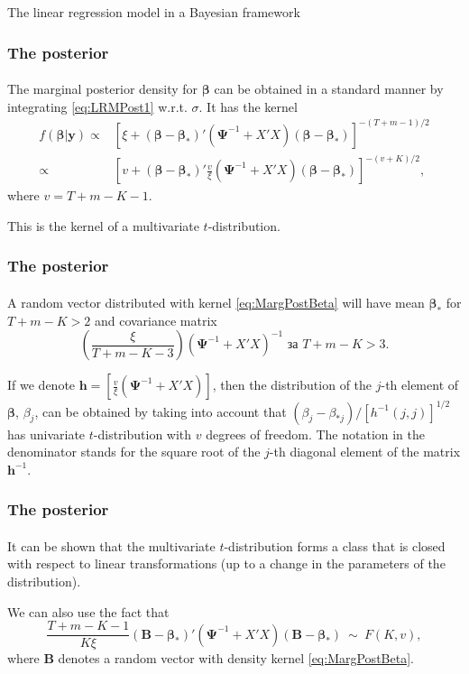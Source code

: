 \documentclass[10pt]{beamer}
\theoremstyle{definition}
\begin{document}
\begin{section}{The linear regression model in a Bayesian framework}
\begin{frame}[fragile]
\frametitle{The posterior}
\framesubtitle{}
The marginal posterior density for $\boldsymbol{\beta}$ can be obtained in a standard manner by integrating \eqref{eq:LRMPost1} w.r.t.
$\sigma$. It has the kernel \begin{equation}
\label{eq:MargPostBeta}\begin{split} f(\boldsymbol{\beta}|\mathbf{y})\propto
& \left[ \xi +
(\boldsymbol{\beta}-\boldsymbol{\beta_*})'(\boldsymbol{\Psi}^{-1}+X'X)(\boldsymbol{\beta}-\boldsymbol{\beta_*})
\right]^{-(T+m-1)/2}\\ \propto & \left[
v+(\boldsymbol{\beta}-\boldsymbol{\beta_*})'\frac{v}{\xi}(\boldsymbol{\Psi}^{-1}+X'X)(\boldsymbol{\beta}-\boldsymbol{\beta_*})\right]^{-(v+K)/2},
\end{split}
\end{equation} 
where $v=T+m-K-1$. \bigskip \bigskip

This is the kernel of a multivariate $t$-distribution. 
\end{frame}

\begin{frame}[fragile]
\frametitle{The posterior}
\framesubtitle{}
A random vector distributed with kernel \eqref{eq:MargPostBeta} will have mean $\boldsymbol{\beta_*}$ for $T+m-K>2$ and covariance matrix $$\left( \frac{\xi}{T+m-K-3}
\right)(\boldsymbol{\Psi}^{-1}+X'X)^{-1} \textrm{ за } T+m-K>3.$$ \bigskip \bigskip

If we denote $\mathbf{h}=\left[ \frac{v}{\xi}(\boldsymbol{\Psi}^{-1}+X'X)
\right]$, then the distribution of the $j$-th element of $\boldsymbol{\beta}$,
$\beta_j$, can be obtained by taking into account that 
$(\beta_j-\beta_{*j})/[h^{-1}(j,j)]^{1/2}$ has univariate $t$-distribution with $v$ degrees of freedom. The notation in the denominator stands for the square root of the $j$-th diagonal element of the matrix $\mathbf{h}^{-1}$.
\end{frame}

\begin{frame}[fragile]
\frametitle{The posterior}
\framesubtitle{}
It can be shown that the multivariate $t$-distribution forms a class that is closed with respect to linear transformations (up to a change in the parameters of the distribution). 

We can also use the fact that \begin{equation*}
\frac{T+m-K-1}{K\xi}(\mathbf{B}-\boldsymbol{\beta_*})'(\boldsymbol{\Psi}^{-1}+X'X)(\mathbf{B}-\boldsymbol{\beta_*})~\sim~F(K,v),
\end{equation*} 
where $\mathbf{B}$ denotes a random vector with density kernel \eqref{eq:MargPostBeta}. 


\end{frame}
\end{section}
\end{document}
